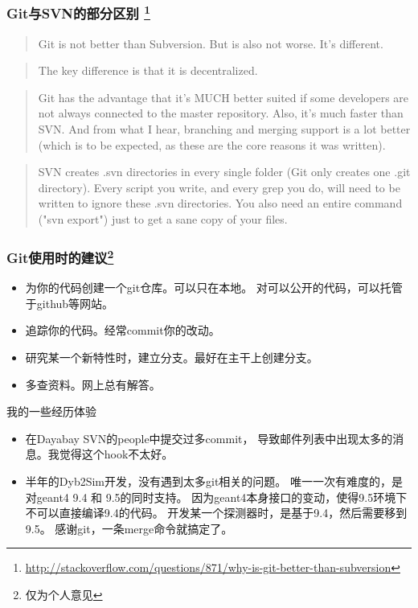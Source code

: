 \begin{frame}
    \frametitle{Git与SVN的部分区别
        \footnote{\scriptsize \url{http://stackoverflow.com/questions/871/why-is-git-better-than-subversion}}}
        \begin{quote}
            Git is not better than Subversion. But is also not worse. It's
            different.
        \end{quote}

        \begin{quote}
            The key difference is that it is decentralized.
        \end{quote}

        \begin{quote}
            Git has the advantage that it's MUCH better suited if some
            developers are not always connected to the master repository. Also,
            it's much faster than SVN. And from what I hear, branching and
            merging support is a lot better (which is to be expected, as these
            are the core reasons it was written).
        \end{quote}

        \begin{quote}
            SVN creates .svn directories in every single folder (Git only
            creates one .git directory). Every script you write, and every grep
            you do, will need to be written to ignore these .svn directories.
            You also need an entire command ("svn export") just to get a sane
            copy of your files.
        \end{quote}
\end{frame}

\begin{frame}
    \frametitle{Git使用时的建议\footnote{\scriptsize 仅为个人意见}}
    \begin{itemize}
        \item 为你的代码创建一个git仓库。可以只在本地。
              对可以公开的代码，可以托管于github等网站。
        \item 追踪你的代码。经常commit你的改动。
        \item 研究某一个新特性时，建立分支。最好在主干上创建分支。
        \item 多查资料。网上总有解答。
    \end{itemize}
    \begin{block}{我的一些经历体验}
        \begin{itemize}
            \item 在Dayabay SVN的people中提交过多commit，
                  导致邮件列表中出现太多的消息。我觉得这个hook不太好。
            \item 半年的Dyb2Sim开发，没有遇到太多git相关的问题。
                  唯一一次有难度的，是对geant4 9.4 和 9.5的同时支持。
                  因为geant4本身接口的变动，使得9.5环境下不可以直接编译9.4的代码。
                  开发某一个探测器时，是基于9.4，然后需要移到9.5。
                  感谢git，一条merge命令就搞定了。
        \end{itemize}
    \end{block}
\end{frame}
